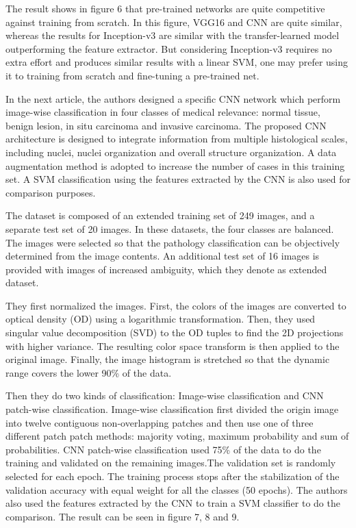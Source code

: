 \documentclass[10pt,twocolumn,letterpaper]{article}
\begin{document}
The result shows in figure 6 that pre-trained networks are quite competitive against training from scratch. In this figure, VGG16 and CNN are quite similar, whereas the results for Inception-v3 are similar with the transfer-learned model outperforming the feature extractor. But considering Inception-v3 requires no extra effort and produces similar results with a linear SVM, one may prefer using it to training from scratch and fine-tuning a pre-trained net.

In the next article\cite{araujo2017classification}, the authors designed a specific CNN network which perform image-wise classification in four classes of medical relevance: normal tissue, benign lesion, in situ carcinoma and invasive carcinoma. The proposed CNN architecture is designed to integrate information from multiple histological scales, including nuclei, nuclei organization and overall structure organization. A data augmentation method is adopted to increase the number of cases in this training set. A SVM classification using the features extracted by the CNN is also used for comparison purposes.

The dataset is composed of an extended training set of 249 images, and a separate test set of 20 images. In these datasets, the four classes are balanced. The images were selected so that the pathology classification can be objectively determined from the image contents. An additional
test set of 16 images is provided with images of increased ambiguity, which they denote as extended dataset.

They first normalized the images. First, the colors of the images are converted to optical density (OD) using a logarithmic transformation. Then, they used singular value decomposition (SVD)  to the OD tuples to find the 2D projections with higher variance. The resulting color space transform is then applied to the original image. Finally, the image histogram is stretched so that the dynamic range covers the lower 90\% of the data.

Then they do two kinds of classification: Image-wise classification and CNN patch-wise classification. Image-wise classification first divided the origin image into twelve contiguous non-overlapping patches and then use one of three different patch patch methods: majority voting, maximum probability and sum of probabilities. CNN patch-wise classification used 75\% of the data to do the training and validated on the remaining images.The validation set is randomly selected for each epoch. The training process stops after the stabilization of the validation accuracy with equal weight for all the classes (50 epochs). The authors also used the features extracted by the CNN to train a SVM classifier to do the comparison. The result can be seen in figure 7, 8 and 9.
\end{document}
